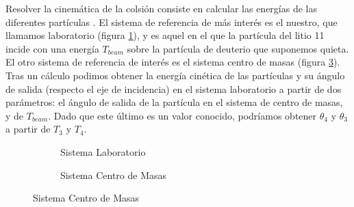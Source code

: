 \documentclass[12pt,a4paper]{article}
\numberwithin{equation}{section}
\numberwithin{figure}{section}
\begin{document}
Resolver la cinemática de la colsión consiste en calcular las energías de las diferentes partículas . El sistema de referencia de más interés es el nuestro, que llamamos laboratorio (figura \ref{Fig:2.2.01-Lab}), y es aquel en el que la partícula del litio 11 incide con una energía $T_{beam}$ sobre la partícula de deuterio que suponemos quieta. El otro sistema de referencia de interés es el sistema centro de masas (figura \ref{Fig:2.2.01-CM}). \\

Tras un cálculo podimos obtener la energía cinética de las partículas y su ángulo de salida (respecto el eje de incidencia) en el sistema laboratorio a partir de dos parámetros: el ángulo de salida de la partícula en el sistema de centro de masas, y de $T_{beam}$. Dado que este último es un valor conocido, podríamos obtener $\theta_4$ y $\theta_3$ a partir de $T_3$ y $T_4$.   \\

\begin{figure}[h!] \centering
\begin{subfigure}[b]{0.45\linewidth} \centering
    \caption{Sistema Laboratorio}
    \label{Fig:2.2.01-Lab}
\end{subfigure}
\begin{subfigure}[b]{0.45\linewidth} \centering
    \caption{Sistema Centro de Masas}
    \label{Fig:2.2.01-CM}
\end{subfigure}
\end{figure}
\end{document}
